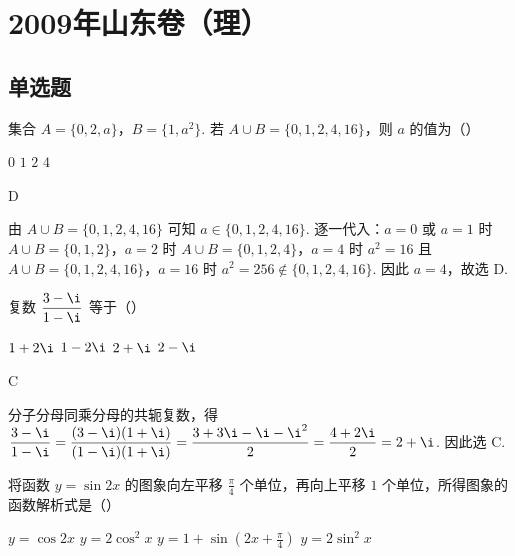 \chapter{2009年山东卷（理）}

\section{单选题}

\begin{problem}
集合 \(A = \{0, 2, a\}\)，\(B = \{1, a^2\}\). 若 \(A \cup B = \{0, 1, 2, 4, 16\}\)，则 \(a\) 的值为（\quad）

\choices
    {\(0\)}
    {\(1\)}
    {\(2\)}
    {\(4\)}
\end{problem}

\begin{answer}
D
\end{answer}

\begin{solution}
由 \(A\cup B=\{0,1,2,4,16\}\) 可知 \(a\in\{0,1,2,4,16\}\). 逐一代入：\(a=0\) 或 \(a=1\) 时 \(A\cup B=\{0,1,2\}\)，\(a=2\) 时 \(A\cup B=\{0,1,2,4\}\)，\(a=4\) 时 \(a^2=16\) 且 \(A\cup B=\{0,1,2,4,16\}\)，\(a=16\) 时 \(a^2=256\notin\{0,1,2,4,16\}\). 因此 \(a=4\)，故选 D.
\end{solution}

\begin{problem}
复数 \(\dfrac{3 - \i}{1 - \i}\) 等于（\quad）

\choices
    {\(1 + 2\i\)}
    {\(1 - 2\i\)}
    {\(2 + \i\)}
    {\(2 - \i\)}
\end{problem}

\begin{answer}
C
\end{answer}

\begin{solution}
分子分母同乘分母的共轭复数，得
\(\displaystyle \frac{3-\i}{1-\i}=\frac{(3-\i)(1+\i)}{(1-\i)(1+\i)}=\frac{3+3\i-\i-\i^2}{2}=\frac{4+2\i}{2}=2+\i\).
因此选 C.
\end{solution}

\begin{problem}
将函数 \( y = \sin 2x \) 的图象向左平移 \( \frac{\pi}{4} \) 个单位，再向上平移 \(1\) 个单位，所得图象的函数解析式是（\quad）

\choices
    {\(y = \cos 2x\)}
    {\(y = 2\cos^2 x\)}
    {\(y = 1 + \sin \left(2x + \frac{\pi}{4}\right)\)}
    {\(y = 2\sin^2 x\)}
\end{problem}

